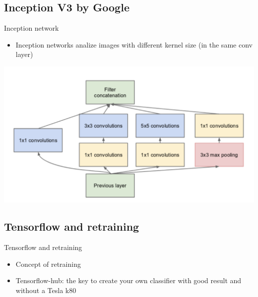 \documentclass{beamer}
\begin{document}
\subsection{Inception V3 by Google}

\begin{frame}{Inception network}
	\begin{itemize}
		\setlength\itemsep{1em}
		[triangle]
		\item 
			Inception networks analize images with different kernel size (in the same conv layer)
	\end{itemize}
	\begin{center}
		\includegraphics[scale=0.28]{inception}
	\end{center}
\end{frame}

\subsection{Tensorflow and retraining}

\begin{frame}{Tensorflow and retraining}
	\begin{itemize}
		\setlength\itemsep{1em}
		[triangle]
		\item 
			Concept of retraining
		\item 
			Tensorflow-hub: the key to create your own classifier with good result and without a Tesla k80
	\end{itemize}
\end{frame}
\end{document}
